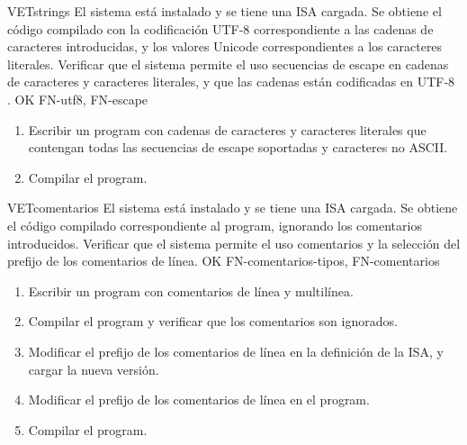 \begin{testCase}{VET}{strings}
    {El sistema está instalado y se tiene una \gls{ISA} cargada.} %
    {Se obtiene el código compilado con la codificación UTF-8 \parencite{UTF-8}
    correspondiente a las cadenas de caracteres introducidas, y los valores
    Unicode \parencite{UTF-8} correspondientes a los caracteres literales.} %
    {Verificar que el sistema permite el uso secuencias de escape en cadenas de
    caracteres y caracteres literales, y que las cadenas están codificadas en
    UTF-8 \parencite{UTF-8}.} %
    {OK} %
    {FN-utf8, FN-escape} %
    \begin{enumerate}[leftmargin=*, topsep=0pt, noitemsep] %
        \item Escribir un \gls{program} con cadenas de caracteres y caracteres
        literales que contengan todas las secuencias de escape soportadas y
        caracteres no ASCII.
        \item Compilar el \gls{program}.
    \end{enumerate}
\end{testCase}

\begin{testCase}{VET}{comentarios}
    {El sistema está instalado y se tiene una \gls{ISA} cargada.} %
    {Se obtiene el código compilado correspondiente al \gls{program}, ignorando los
    comentarios introducidos.} %
    {Verificar que el sistema permite el uso comentarios y la selección del
    prefijo de los comentarios de línea.} %
    {OK} %
    {FN-comentarios-tipos, FN-comentarios} %
    \begin{enumerate}[leftmargin=*, topsep=0pt, noitemsep] %
        \item Escribir un \gls{program} con comentarios de línea y multilínea.
        \item Compilar el \gls{program} y verificar que los comentarios son
        ignorados.
        \item Modificar el prefijo de los comentarios de línea en la definición
        de la \gls{ISA}, y cargar la nueva versión.
        \item Modificar el prefijo de los comentarios de línea en el
        \gls{program}.
        \item Compilar el \gls{program}.
    \end{enumerate}
\end{testCase}

